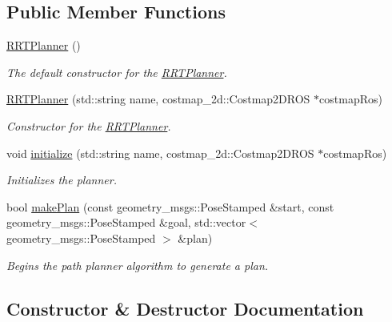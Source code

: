 \subsection*{Public Member Functions}
\begin{DoxyCompactItemize}
\item 
\hyperlink{classRRTPlanner_a1cbf32fc5cc6dd54404f3ffd25abe34c}{R\+R\+T\+Planner} ()\hypertarget{classRRTPlanner_a1cbf32fc5cc6dd54404f3ffd25abe34c}{}\label{classRRTPlanner_a1cbf32fc5cc6dd54404f3ffd25abe34c}

\begin{DoxyCompactList}\small\item\em The default constructor for the \hyperlink{classRRTPlanner}{R\+R\+T\+Planner}. \end{DoxyCompactList}\item 
\hyperlink{classRRTPlanner_a1f5ba162fab96f8efbf87f4b106d8790}{R\+R\+T\+Planner} (std\+::string name, costmap\+\_\+2d\+::\+Costmap2\+D\+R\+OS $\ast$costmap\+Ros)
\begin{DoxyCompactList}\small\item\em Constructor for the \hyperlink{classRRTPlanner}{R\+R\+T\+Planner}. \end{DoxyCompactList}\item 
void \hyperlink{classRRTPlanner_af5b3c48c51620d4e94f8a634589e86fb}{initialize} (std\+::string name, costmap\+\_\+2d\+::\+Costmap2\+D\+R\+OS $\ast$costmap\+Ros)
\begin{DoxyCompactList}\small\item\em Initializes the planner. \end{DoxyCompactList}\item 
bool \hyperlink{classRRTPlanner_ab9abaa15f3deee70dfda2de38f1a6e49}{make\+Plan} (const geometry\+\_\+msgs\+::\+Pose\+Stamped \&start, const geometry\+\_\+msgs\+::\+Pose\+Stamped \&goal, std\+::vector$<$ geometry\+\_\+msgs\+::\+Pose\+Stamped $>$ \&plan)
\begin{DoxyCompactList}\small\item\em Begins the path planner algorithm to generate a plan. \end{DoxyCompactList}\end{DoxyCompactItemize}


\subsection{Constructor \& Destructor Documentation}
